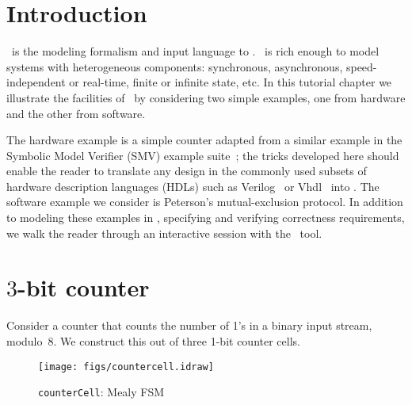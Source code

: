 \label{chap:tut}
\section{Introduction}

\rem\ is the modeling formalism and input language to \mocha. \rem\ is rich
enough to model systems with heterogeneous components: synchronous,
asynchronous, speed-independent or real-time, finite or infinite
state, etc. In this tutorial chapter we illustrate the facilities of \mocha\
by considering two simple examples, one from hardware and the other
from software. 

The hardware example is a simple counter adapted from a
similar example in the Symbolic Model Verifier ({\sc SMV}) example suite~\cite{};
the tricks developed here should enable the reader to translate any design in the commonly
used subsets of hardware description languages (HDLs) such as
{\sc Verilog}~\cite{} or {\sc Vhdl}~\cite{} into \rem. 
The software example we consider is Peterson's mutual-exclusion
protocol. In addition to modeling these examples in \rem, specifying and verifying correctness
requirements, we walk the reader through an interactive session with
the \mocha\ tool.

\section{$3$-bit counter}
Consider a counter that counts the number of 1's in a binary
input stream, modulo~8. We construct this out of three 1-bit
counter cells. 

\begin{figure}
\centerline{\texttt{[image: figs/countercell.idraw]}}
\caption{{\tt counterCell}: Mealy FSM}
\label{fig:countercell_ckt}
\end{figure}

